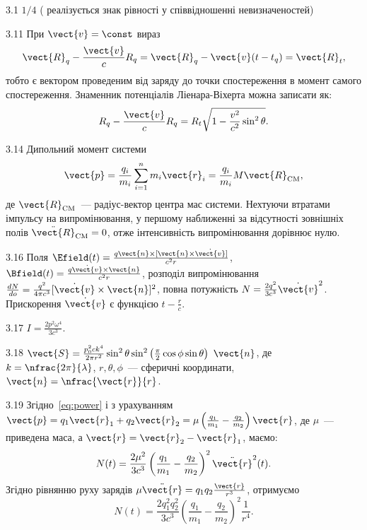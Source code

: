 \protect \section *{}
\begin{Solution}{3.{1}}
	$1/4$ ( реалізується знак рівності у співвідношенні невизначеностей)
\end{Solution}
\begin{Solution}{3.{11}}
	При $\vect{v} = \const$  вираз
	\[
		\vect{R}_q - \frac{\vect{v}}{c} R_q = \vect{R}_q -\vect{v}(t - t_q) = \vect{R}_t,
	\]
	тобто є вектором проведеним від заряду до точки спостереження в момент самого спостереження.
	Знаменник потенціалів Ліенара-Віхерта можна записати як:
	\[
		R_q - \frac{\vect{v}}{c} R_q = R_t\sqrt{1-\frac{v^2}{c^2}\sin^2\theta}.
	\]
\end{Solution}
\begin{Solution}{3.{14}}
	Дипольний момент системи
	\[
		\vect{p} = \frac{q_i}{m_i} \sum\limits_{i = 1}^n m_i \vect{r}_i = \frac{q_i}{m_i} M\vect{R}_\mathrm{CM},
	\]
	де $\vect{R}_\mathrm{CM}$~--- радіус-вектор центра мас системи. Нехтуючи втратами імпульсу на випромінювання, у першому наближенні за відсутності зовнішніх полів $\ddot{\vect{R}}_\mathrm{CM} = 0$, отже інтенсивність випромінювання дорівнює нулю.
\end{Solution}
\begin{Solution}{3.{16}}
%
	Поля $\Efield(t) = \frac{q\vect{n}\times[ \vect{n} \times \dot{\vect{v}}] }{c^2r}$,
	$\Bfield(t) = \frac{q\dot{\vect{v}}\times\vect{n}}{c^2r}$,
	розподіл випромінювання $\frac{dN}{do} = \frac{q^2}{4\pi c^3}[\dot{\vect{v}}\times\vect{n}]^2$, повна потужність $N = \frac{2q^2}{3c^3}\dot{\vect{v}}^2$. Прискорення $ \dot{\vect{v}} $ є функцією $t - \frac{r}{c}$.
\end{Solution}
\begin{Solution}{3.{17}}
	$I = \frac{2p^2\omega^4}{3c^3}$.
\end{Solution}
\begin{Solution}{3.{18}}
	$\vect{S} = \frac{p_0^2ck^4}{2\pi r^2}\sin^2\theta\sin^2\left(\frac\pi2\cos\phi\sin\theta\right)\ \vect{n}$, де $k=\nfrac{2\pi}{\lambda}$, $r,\theta,\phi$~--- сферичні координати, $\vect{n} = \nfrac{\vect{r}}{r}$.
\end{Solution}
\begin{Solution}{3.{19}}
	Згідно~\eqref{eq:power} і з урахуванням $\vect{p} = q_1\vect{r}_1 + q_2\vect{r}_2 = \mu\left( \frac{q_1}{m_1}  - \frac{q_2}{m_2}\right)\vect{r} $, де $\mu$~--- приведена маса, а $\vect{r} = \vect{r}_2 - \vect{r}_1$, маємо:
	\[
		N(t) = \frac{2\mu^2}{3c^3}\left( \frac{q_1}{m_1}  - \frac{q_2}{m_2}\right)^2\ddot{\vect{r}}^2(t).
	\]
	Згідно рівнянню руху зарядів $\mu\ddot{\vect{r}} = {q_1q_2}\frac{\vect{r}}{r^3}$, отримуємо
	\[
		N(t) = \frac{2q_1^2q_2^2}{3c^3} \left( \frac{q_1}{m_1} - \frac{q_2}{m_2}\right)^2 \frac{1}{r^4}.
	\]
\end{Solution}
